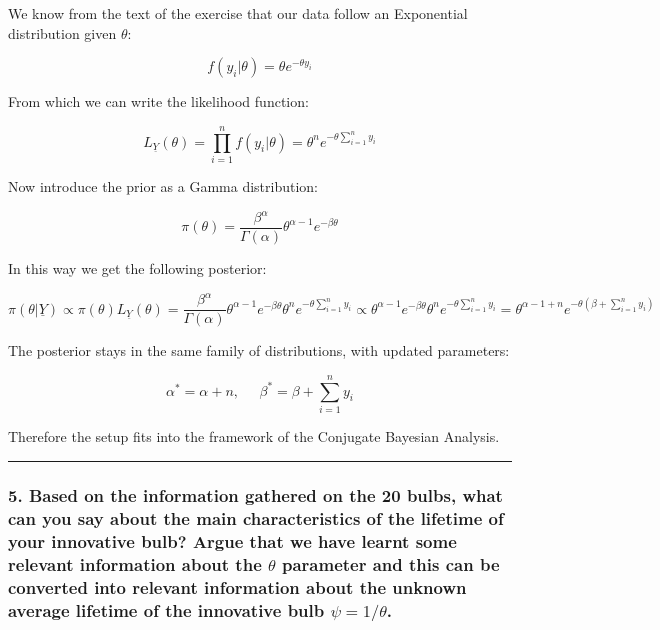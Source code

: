 \documentclass[
]{article}
\begin{document}
We know from the text of the exercise that our data follow an
Exponential distribution given \(\theta\):

\[
f(y_i|\theta) = \theta e^{-\theta y_i}
\]

From which we can write the likelihood function:

\[
L_{\underline{Y}}(\theta) = \prod_{i=1}^{n}f(y_i|\theta) = \theta^n e^{-\theta \sum_{i=1}^{n} y_i}
\]

Now introduce the prior as a Gamma distribution:

\[
\pi(\theta) = \frac{\beta^{\alpha}}{\Gamma(\alpha)}\theta^{\alpha-1}e^{-\beta \theta}
\]

In this way we get the following posterior:

\[
\pi(\theta|\underline{Y}) \propto
\pi(\theta)L_{\underline{Y}}(\theta) =
\frac{\beta^{\alpha}}{\Gamma(\alpha)}\theta^{\alpha-1}e^{-\beta \theta} \theta^n e^{-\theta \sum_{i=1}^{n} y_i}
\propto \theta^{\alpha-1}e^{-\beta\theta}\theta^ne^{-\theta \sum_{i=1}^{n} y_i}=\theta^{\alpha - 1 + n}e^{-\theta(\beta + \sum_{i=1}^{n} y_i)}
\]

The posterior stays in the same family of distributions, with updated
parameters:

\[
\alpha^* = \alpha + n, \;\;\;\;\; \beta^* = \beta + \sum_{i=1}^{n} y_i
\]

Therefore the setup fits into the framework of the Conjugate Bayesian
Analysis.

\begin{center}\rule{0.5\linewidth}{0.5pt}\end{center}

\hypertarget{based-on-the-information-gathered-on-the-20-bulbs-what-can-you-say-about-the-main-characteristics-of-the-lifetime-of-your-innovative-bulb-argue-that-we-have-learnt-some-relevant-information-about-the-theta-parameter-and-this-can-be-converted-into-relevant-information-about-the-unknown-average-lifetime-of-the-innovative-bulb-psi1theta.}{%
\subsubsection{\texorpdfstring{5. Based on the information gathered on
the 20 bulbs, what can you say about the main characteristics of the
lifetime of your innovative bulb? Argue that we have learnt some
relevant information about the \(\theta\) parameter and this can be
converted into relevant information about the unknown average lifetime
of the innovative bulb
\(\psi=1/\theta\).}{5. Based on the information gathered on the 20 bulbs, what can you say about the main characteristics of the lifetime of your innovative bulb? Argue that we have learnt some relevant information about the \textbackslash theta parameter and this can be converted into relevant information about the unknown average lifetime of the innovative bulb \textbackslash psi=1/\textbackslash theta.}}\label{based-on-the-information-gathered-on-the-20-bulbs-what-can-you-say-about-the-main-characteristics-of-the-lifetime-of-your-innovative-bulb-argue-that-we-have-learnt-some-relevant-information-about-the-theta-parameter-and-this-can-be-converted-into-relevant-information-about-the-unknown-average-lifetime-of-the-innovative-bulb-psi1theta.}}
\end{document}
